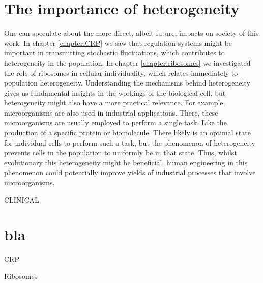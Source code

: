 \section{The importance of heterogeneity}

One can speculate about the more direct, albeit future, impacts on society of this work.
%
In chapter \ref{chapter:CRP} we saw that regulation systems might be important in transmitting stochastic fluctuations, 
which contributes to heterogeneity in the population.
%
In chapter \ref{chapter:ribosomes} we investigated the role of ribosomes in cellular individuality, which relates immediately to population heterogeneity.
%
Understanding the mechanisms behind heterogeneity gives us fundamental insights in the workings of the biological cell, 
but heterogeneity might also have a more practical relevance.
%
For example, microorganisms are also used in industrial applications.
There, these microorganisms are usually employed to perform a single task.
%
Like the production of a specific protein or biomolecule.
%
There likely is an optimal state for individual cells to perform such a task, 
but the phenomenon of heterogeneity prevents cells in the population to uniformly be in that state.
%
%
Thus, whilst evolutionary this heterogeneity might be beneficial,
human engineering in this phenomenon could potentially improve yields of industrial processes that involve microorganisms.



CLINICAL

\section{bla}

CRP



Ribosomes








